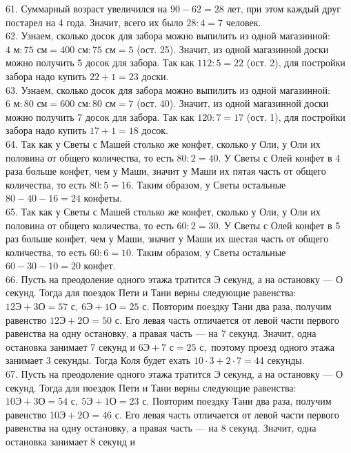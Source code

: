 61. Суммарный возраст увеличился на $90-62=28$ лет, при этом каждый друг постарел на 4 года. Значит, всего их было $28:4=7$ человек.\\
62. Узнаем, сколько досок для забора можно выпилить из одной магазинной: $4\text{ м}:75\text{ см}=400\text{ см}:75\text{ см}=5$ (ост. 25). Значит, из одной магазинной доски можно получить 5 досок для забора. Так как $112:5=22$ (ост. 2), для постройки забора надо купить $22+1=23$ доски.\\
63. Узнаем, сколько досок для забора можно выпилить из одной магазинной: $6\text{ м}:80\text{ см}=600\text{ см}:80\text{ см}=7$ (ост. 40). Значит, из одной магазинной доски можно получить 7 досок для забора. Так как $120:7=17$ (ост. 1), для постройки забора надо купить $17+1=18$ досок.\\
64. Так как у Светы с Машей столько же конфет, сколько у Оли, у Оли их половина от общего количества, то есть $80:2=40.$ У Светы с Олей конфет в 4 раза больше конфет, чем у Маши, значит у Маши их пятая часть от общего количества, то есть $80:5=16.$ Таким образом, у Светы остальные $80-40-16=24$ конфеты.\\
65. Так как у Светы с Машей столько же конфет, сколько у Оли, у Оли их половина от общего количества, то есть $60:2=30.$ У Светы с Олей конфет в 5 раз больше конфет, чем у Маши, значит у Маши их шестая часть от общего количества, то есть $60:6=10.$ Таким образом, у Светы остальные $60-30-10=20$ конфет.\\
66. Пусть на преодоление одного этажа тратится Э секунд, а на остановку --- О секунд. Тогда для поездок Пети и Тани верны следующие равенства: $12\text{Э}+3\text{О}=57\text{ с},\ 6\text{Э}+1\text{О}=25\text{ с}.$ Повторим поездку Тани два раза, получим равенство $12\text{Э}+2\text{О}=50\text{ с}.$ Его левая часть отличается от левой части первого равенства на одну остановку, а правая часть --- на 7 секунд. Значит, одна остановка занимает 7 секунд и
$6\text{Э}+7\text{ с}=25\text{ с},$ поэтому проезд одного этажа занимает 3 секунды. Тогда Коля будет ехать $10\cdot3+2\cdot7=44$ секунды.\\
67. Пусть на преодоление одного этажа тратится Э секунд, а на остановку --- О секунд. Тогда для поездок Пети и Тани верны следующие равенства: $10\text{Э}+3\text{О}=54\text{ с},\ 5\text{Э}+1\text{О}=23\text{ с}.$ Повторим поездку Тани два раза, получим равенство $10\text{Э}+2\text{О}=46\text{ с}.$ Его левая часть отличается от левой части первого равенства на одну остановку, а правая часть --- на 8 секунд. Значит, одна остановка занимает 8 секунд и
